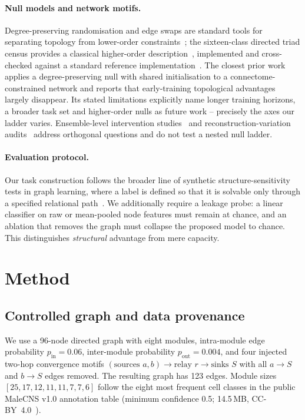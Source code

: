 \documentclass[10pt,twocolumn,letterpaper]{article}
\begin{document}
\paragraph{Null models and network motifs.}
Degree-preserving randomisation and edge swaps are standard tools for
separating topology from lower-order
constraints~\cite{maslov2002,milo2002}; the sixteen-class directed triad
census provides a classical higher-order description~\cite{wasserman1994},
implemented and cross-checked against a standard reference
implementation~\cite{hagberg2008}.
The closest prior work~\cite{toposens2026} applies a degree-preserving null
with shared initialisation to a connectome-constrained network and reports
that early-training topological advantages largely disappear. Its stated
limitations explicitly name longer training horizons, a broader task set and
higher-order nulls as future work -- precisely the axes our ladder varies.
Ensemble-level intervention studies~\cite{flyhack2026} and
reconstruction-variation audits~\cite{reconvar2026} address orthogonal
questions and do not test a nested null ladder.

\paragraph{Evaluation protocol.}
Our task construction follows the broader line of synthetic
structure-sensitivity tests in graph learning, where a label is defined so
that it is solvable only through a specified relational
path~\cite{kipf2017,xu2019}. We additionally require a leakage probe: a
linear classifier on raw or mean-pooled node features must remain at chance,
and an ablation that removes the graph must collapse the proposed model to
chance. This distinguishes \emph{structural} advantage from mere capacity.

\section{Method}
\label{sec:method}

\subsection{Controlled graph and data provenance}
\label{sec:graph}

We use a 96-node directed graph with eight modules, intra-module edge
probability $p_{\text{in}}=0.06$, inter-module probability
$p_{\text{out}}=0.004$, and four injected two-hop convergence motifs
$(\text{sources } a,b)\to \text{relay } r\to \text{sinks } S$ with all
$a\!\to\!S$ and $b\!\to\!S$ edges removed. The resulting graph has 123 edges.
Module sizes $[25,17,12,11,11,7,7,6]$ follow the eight most frequent
cell classes in the public MaleCNS v1.0 annotation table (minimum confidence
0.5; 14.5\,MB, CC-BY~4.0~\cite{malecns2026}).
\end{document}
